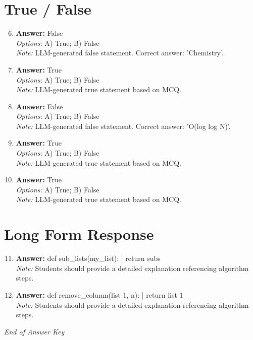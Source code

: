 \documentclass[12pt]{article}
\begin{document}
\section*{True / False}
\begin{enumerate}[label=\arabic*.]
\setcounter{enumi}{5}
\item \textbf{Answer:} False
\\ \textit{Options:} A) True; B) False
\\ \textit{Note:} LLM-generated false statement. Correct answer: 'Chemistry'.
\item \textbf{Answer:} True
\\ \textit{Options:} A) True; B) False
\\ \textit{Note:} LLM-generated true statement based on MCQ.
\item \textbf{Answer:} False
\\ \textit{Options:} A) True; B) False
\\ \textit{Note:} LLM-generated false statement. Correct answer: 'O(log log N)'.
\item \textbf{Answer:} True
\\ \textit{Options:} A) True; B) False
\\ \textit{Note:} LLM-generated true statement based on MCQ.
\item \textbf{Answer:} True
\\ \textit{Options:} A) True; B) False
\\ \textit{Note:} LLM-generated true statement based on MCQ.
\end{enumerate}

\section*{Long Form Response}
\begin{enumerate}[label=\arabic*.]
\setcounter{enumi}{10}
\item \textbf{Answer:} def sub\_lists(my\_list): | return subs
\\ \textit{Note:} Students should provide a detailed explanation referencing algorithm steps.
\item \textbf{Answer:} def remove\_column(list 1, n): | return list 1
\\ \textit{Note:} Students should provide a detailed explanation referencing algorithm steps.
\end{enumerate}

\vfill
\noindent\textit{End of Answer Key}
\end{document}
